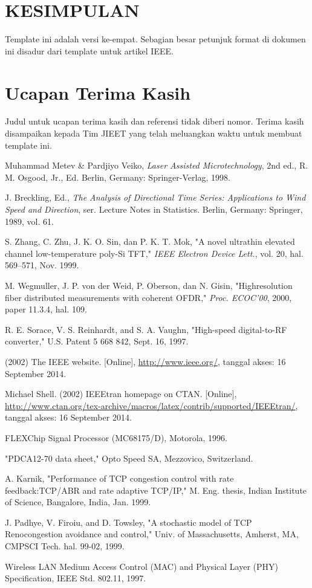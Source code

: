 \documentclass[10pt,twocolumn]{article}
\begin{document}
\section{\MakeUppercase{Kesimpulan}}
Template ini adalah versi ke-empat. Sebagian besar petunjuk format di dokumen ini disadur dari template untuk artikel IEEE.

\section*{Ucapan Terima Kasih}
Judul untuk ucapan terima kasih dan referensi tidak diberi nomor. Terima kasih disampaikan kepada Tim JIEET yang telah meluangkan waktu untuk membuat template ini.


\begin{thebibliography}{99}
\eightp
{}
Muhammad Metev \& Pardjiyo Veiko, \textit{Laser Assisted Microtechnology}, 2nd ed., R. M. Osgood, Jr., Ed. Berlin, Germany: Springer-Verlag, 1998.

J. Breckling, Ed., \textit{The Analysis of Directional Time Series: Applications to Wind Speed and Direction}, ser. Lecture Notes in Statistics. Berlin, Germany: Springer, 1989, vol. 61.

S. Zhang, C. Zhu, J. K. O. Sin, dan P. K. T. Mok, "A novel ultrathin elevated channel low-temperature poly-Si TFT," \textit{IEEE Electron Device Lett.}, vol. 20, hal. 569--571, Nov. 1999.

M. Wegmuller, J. P. von der Weid, P. Oberson, dan N. Gisin, "Highresolution fiber distributed measurements with coherent OFDR," \textit{Proc. ECOC'00}, 2000, paper 11.3.4, hal. 109.

R. E. Sorace, V. S. Reinhardt, and S. A. Vaughn, "High-speed digital-to-RF converter," U.S. Patent 5 668 842, Sept. 16, 1997.

(2002) The IEEE website. [Online], \url{http://www.ieee.org/}, tanggal akses: 16 September 2014.

Michael Shell. (2002) IEEEtran homepage on CTAN. [Online], \url{http://www.ctan.org/tex-archive/macros/latex/contrib/supported/IEEEtran/}, tanggal akses: 16 September 2014.

FLEXChip Signal Processor (MC68175/D), Motorola, 1996.

"PDCA12-70 data sheet," Opto Speed SA, Mezzovico, Switzerland.

A. Karnik, "Performance of TCP congestion control with rate feedback:TCP/ABR and rate adaptive TCP/IP," M. Eng. thesis, Indian Institute of Science, Bangalore, India, Jan. 1999.

J. Padhye, V. Firoiu, and D. Towsley, "A stochastic model of TCP Renocongestion avoidance and control," Univ. of Massachusetts, Amherst, MA, CMPSCI Tech. hal. 99-02, 1999.

Wireless LAN Medium Access Control (MAC) and Physical Layer (PHY) Specification, IEEE Std. 802.11, 1997.

\end{thebibliography}
\end{document}
